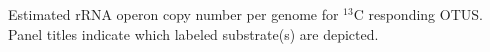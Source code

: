 Estimated rRNA operon copy number per genome for $^{13}$C responding OTUS. Panel titles indicate which labeled substrate(s) are depicted.